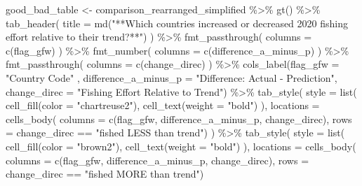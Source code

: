 \documentclass[
]{article}
\newenvironment{Shaded}{\begin{snugshade}}{\end{snugshade}}
\newcommand{\AttributeTok}[1]{\textcolor[rgb]{0.77,0.63,0.00}{#1}}
\newcommand{\FunctionTok}[1]{\textcolor[rgb]{0.00,0.00,0.00}{#1}}
\newcommand{\NormalTok}[1]{#1}
\newcommand{\OtherTok}[1]{\textcolor[rgb]{0.56,0.35,0.01}{#1}}
\newcommand{\SpecialCharTok}[1]{\textcolor[rgb]{0.00,0.00,0.00}{#1}}
\newcommand{\StringTok}[1]{\textcolor[rgb]{0.31,0.60,0.02}{#1}}
\begin{document}
\begin{Shaded}
\begin{Highlighting}[]
\NormalTok{good\_bad\_table }\OtherTok{\textless{}{-}}\NormalTok{ comparison\_rearranged\_simplified }\SpecialCharTok{\%\textgreater{}\%} 
  \FunctionTok{gt}\NormalTok{() }\SpecialCharTok{\%\textgreater{}\%}
  \FunctionTok{tab\_header}\NormalTok{(}
    \AttributeTok{title =} \FunctionTok{md}\NormalTok{(}\StringTok{"**Which countries increased or decreased 2020 fishing effort relative to their trend?**"}\NormalTok{)}
\NormalTok{  ) }\SpecialCharTok{\%\textgreater{}\%}
  \FunctionTok{fmt\_passthrough}\NormalTok{(}
    \AttributeTok{columns =} \FunctionTok{c}\NormalTok{(flag\_gfw)}
\NormalTok{  ) }\SpecialCharTok{\%\textgreater{}\%}
  \FunctionTok{fmt\_number}\NormalTok{(}
  \AttributeTok{columns =} \FunctionTok{c}\NormalTok{(difference\_a\_minus\_p)}
\NormalTok{  ) }\SpecialCharTok{\%\textgreater{}\%}
  \FunctionTok{fmt\_passthrough}\NormalTok{(}
    \AttributeTok{columns =} \FunctionTok{c}\NormalTok{(change\_direc)}
\NormalTok{  ) }\SpecialCharTok{\%\textgreater{}\%}
  \FunctionTok{cols\_label}\NormalTok{(}\AttributeTok{flag\_gfw =} \StringTok{"Country Code"}\NormalTok{ , }
           \AttributeTok{difference\_a\_minus\_p =} \StringTok{"Difference: Actual {-} Prediction"}\NormalTok{,}
           \AttributeTok{change\_direc =} \StringTok{"Fishing Effort Relative to Trend"}\NormalTok{) }\SpecialCharTok{\%\textgreater{}\%} 
  \FunctionTok{tab\_style}\NormalTok{(}
    \AttributeTok{style =} \FunctionTok{list}\NormalTok{(}
      \FunctionTok{cell\_fill}\NormalTok{(}\AttributeTok{color =} \StringTok{"chartreuse2"}\NormalTok{),}
      \FunctionTok{cell\_text}\NormalTok{(}\AttributeTok{weight =} \StringTok{"bold"}\NormalTok{)}
\NormalTok{      ),}
    \AttributeTok{locations =} \FunctionTok{cells\_body}\NormalTok{(}
      \AttributeTok{columns =} \FunctionTok{c}\NormalTok{(flag\_gfw, difference\_a\_minus\_p, change\_direc),}
      \AttributeTok{rows =}\NormalTok{ change\_direc }\SpecialCharTok{==} \StringTok{"fished LESS than trend"}\NormalTok{)}
\NormalTok{  ) }\SpecialCharTok{\%\textgreater{}\%} 
  \FunctionTok{tab\_style}\NormalTok{(}
    \AttributeTok{style =} \FunctionTok{list}\NormalTok{(}
      \FunctionTok{cell\_fill}\NormalTok{(}\AttributeTok{color =} \StringTok{"brown2"}\NormalTok{),}
      \FunctionTok{cell\_text}\NormalTok{(}\AttributeTok{weight =} \StringTok{"bold"}\NormalTok{)}
\NormalTok{      ),}
    \AttributeTok{locations =} \FunctionTok{cells\_body}\NormalTok{(}
      \AttributeTok{columns =} \FunctionTok{c}\NormalTok{(flag\_gfw, difference\_a\_minus\_p, change\_direc),}
      \AttributeTok{rows =}\NormalTok{ change\_direc }\SpecialCharTok{==} \StringTok{"fished MORE than trend"}\NormalTok{)}

\end{Highlighting}
\end{Shaded}
\end{document}
